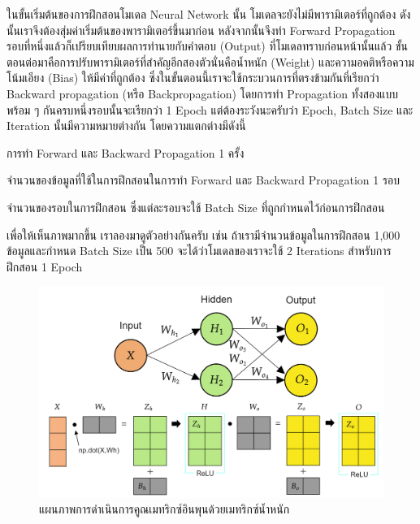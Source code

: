 ในขั้นเริ่มต้นของการฝึกสอนโมเดล Neural Network นั้น โมเดลจะยังไม่มีพารามิเตอร์ที่ถูกต้อง ดังนั้นเราจึงต้องสุ่มค่าเริ่มต้นของพารามิเตอร์ขึ้นมาก่อน หลังจากนั้นจึงทำ Forward Propagation รอบที่หนึ่งแล้วก็เปรียบเทียบผลการทำนายกับคำตอบ (Output) ที่โมเดลทราบก่อนหน้านั้นแล้ว
ขั้นตอนต่อมาคือการปรับพารามิเตอร์ที่สำคัญอีกสองตัวนั่นคือน้ำหนัก (Weight) และความอคติหรือความโน้มเอียง (Bias) ให้มีค่าที่ถูกต้อง
ซึ่งในขั้นตอนนี้เราจะใช้กระบวนการที่ตรงข้ามกันที่เรียกว่า Backward propagation (หรือ Backpropagation) โดยการทำ Propagation
ทั้งสองแบบพร้อม ๆ กันครบหนึ่งรอบนั้นจะเรียกว่า 1 Epoch แต่ต้องระวังนะครับว่า Epoch, Batch Size และ Iteration นั้นมีความหมายต่างกัน โดยความแตกต่างมีดังนี้

\begin{description}[font=$\bullet$~\normalfont\scshape\bfseries\color{blue!50!black}]
    \item[1 Epoch] การทำ Forward และ Backward Propagation 1 ครั้ง

    \item[Batch Size] จำนวนของข้อมูลที่ใช้ในการฝึกสอนในการทำ Forward และ Backward Propagation 1 รอบ

    \item[Iteration] จำนวนของรอบในการฝึกสอน ซึ่งแต่ละรอบจะใช้ Batch Size ที่ถูกกำหนดไว้ก่อนการฝึกสอน
\end{description}

เพื่อให้เห็นภาพมากขึ้น เราลองมาดูตัวอย่างกันครับ เช่น ถ้าเรามีจำนวนข้อมูลในการฝึกสอน 1,000 ข้อมูลและกำหนด Batch Size เป็น 500
จะได้ว่าโมเดลของเราจะใช้ 2 Iterations สำหรับการฝึกสอน 1 Epoch

\begin{figure}[H]
    \centering
    \includegraphics[width=0.8\linewidth]{fig/nn_feedforward_matrices.png}
    \caption{แผนภาพการดำเนินการคูณเมทริกซ์อินพุนด้วยเมทริกซ์น้ำหนัก}
    \label{fig:nn_ff_mat}
\end{figure}

